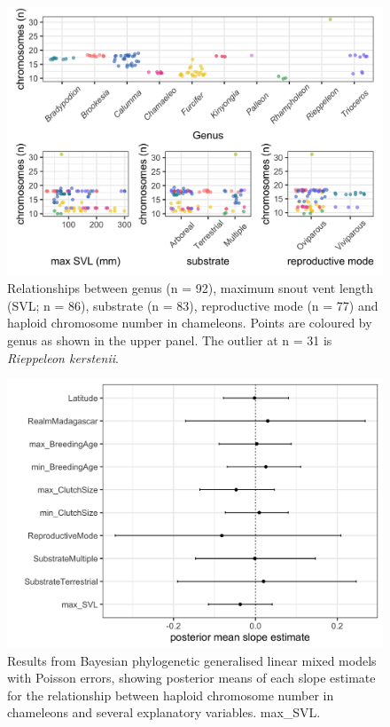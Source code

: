 \documentclass[a4paper, 12pt]{article}
\begin{document}


\begin{figure}[H]
 \centering
  \includegraphics[width = \linewidth]{figures/ecology-genus-svl.png}
  \caption{Relationships between genus (n = 92), maximum snout vent length (SVL; n = 86), substrate (n = 83), reproductive mode (n = 77) and haploid chromosome number in chameleons. Points are coloured by genus as shown in the upper panel. The outlier at n = 31 is \textit{Rieppeleon kerstenii}.
}
  \label{fig-ecology1}
\end{figure} 

\newpage
\begin{figure}[H]
 \centering
  \includegraphics[width = \linewidth]{figures/mcmcglmm-figure.png}
  \caption{Results from Bayesian phylogenetic generalised linear mixed models with Poisson errors, showing posterior means of each slope estimate for the relationship between haploid chromosome number in chameleons and several explanatory variables. max\_SVL.
}
  \label{fig-ecology2}
\end{figure}
\end{document}
